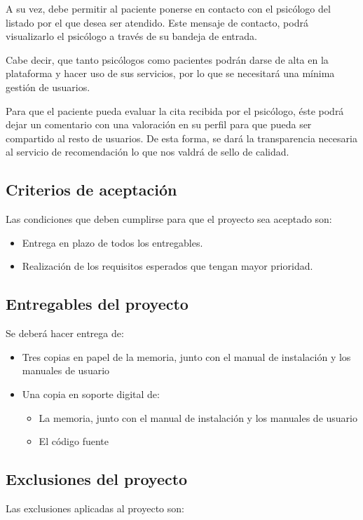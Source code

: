 A su vez, debe permitir al paciente ponerse en contacto con el psicólogo del listado por el que desea ser atendido. Este mensaje de contacto, podrá visualizarlo el psicólogo a través de su bandeja de entrada. 


Cabe decir, que tanto psicólogos como pacientes podrán darse de alta en la plataforma y hacer uso de sus servicios, por lo que se necesitará una mínima gestión de usuarios. 


Para que el paciente pueda evaluar la cita recibida por el psicólogo, éste podrá dejar un comentario con una valoración en su perfil para que pueda ser compartido al resto de usuarios. De esta forma, se dará la transparencia necesaria al servicio de recomendación lo que nos valdrá de sello de calidad.

\subsection{Criterios de aceptación}
Las condiciones que deben cumplirse para que el proyecto sea aceptado son:

\begin{itemize}
\item Entrega en plazo de todos los entregables.
\item Realización de los requisitos esperados que tengan mayor prioridad.
\end{itemize}

\subsection{Entregables del proyecto}
Se deberá hacer entrega de:

\begin{itemize}
\item Tres copias en papel de la memoria, junto con el manual de instalación y los manuales de usuario
\item Una copia en soporte digital de:
	\begin{itemize}
		\item La memoria, junto con el manual de instalación y los manuales de usuario
		\item El código fuente
	\end{itemize}
\end{itemize}

\subsection{Exclusiones del proyecto}
Las exclusiones aplicadas al proyecto son:

